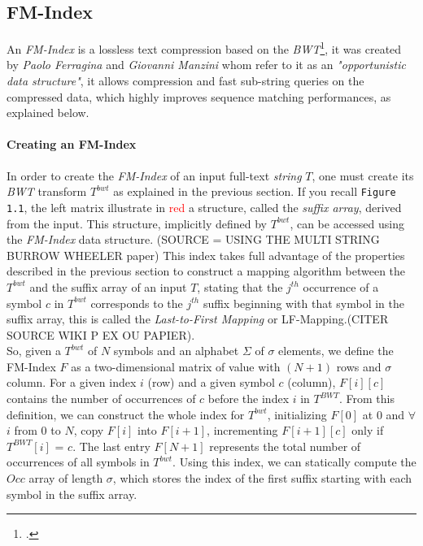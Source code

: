 \subsection{FM-Index}

An \textsl{FM-Index} is a lossless text compression based on the \textsl{BWT}\footcite{FM_INDEX}, it was created by \textsl{Paolo Ferragina} and \textsl{Giovanni Manzini} whom refer to it as an \textit{"opportunistic data structure"}, it allows compression and fast sub-string queries on the compressed data, which highly improves sequence matching performances, as explained below.

\paragraph{Creating an FM-Index}

In order to create the \textsl{FM-Index} of an input full-text \textit{string} $T$, one must create its \textsl{BWT} transform $T^{bwt}$ as explained in the previous section. If you recall \texttt{Figure 1.1}, the left matrix illustrate in \textcolor{red}{red} a structure, called the \textit{suffix array}, derived from the input. This structure, implicitly defined by $T^{bwt}$, can be accessed using the \textsl{FM-Index} data structure. (SOURCE = USING THE MULTI STRING BURROW WHEELER paper) This index takes full advantage of the properties described in the previous section to construct a mapping algorithm between the $T^{bwt}$ and the suffix array of an input $T$, stating that the $j^{th}$ occurrence of a symbol $c$ in $T^{bwt}$ corresponds to the $j^{th}$ suffix beginning with that symbol in the suffix array, this is called the \textsl{Last-to-First Mapping} or LF-Mapping.(CITER SOURCE WIKI P EX OU PAPIER). \\
So, given a $T^{bwt}$ of $N$ symbols and an alphabet $\Sigma$ of $\sigma$ elements, we define the FM-Index $F$ as a two-dimensional matrix of value with $(N + 1)$ rows and $\sigma$ column. For a given index $i$ (row) and a given symbol $c$ (column), $F[i][c]$ contains the number of occurrences of $c$ before the index $i$ in $T^{BWT}$. From this definition, we can construct the whole index for $T^{bwt}$, initializing $F[0]$ at $0$ and $\forall$ $i$ from $0$ to $N$, copy $F[i]$ into $F[i+1]$, incrementing $F[i+1][c]$ only if $T^{BWT}[i]$ = $c$. The last entry $F[N + 1]$ represents the total number of occurrences of all symbols in $T^{bwt}$. Using this index, we can statically compute the $Occ$ array of length $\sigma$, which stores the index of the first suffix starting with each symbol in the suffix array.

